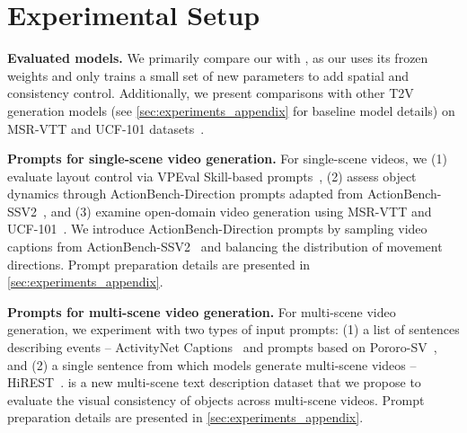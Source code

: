 \documentclass{article}
\begin{document}
\section{Experimental Setup}\label{sec:experiments}

\noindent\textbf{Evaluated models.} 
We primarily compare our \method{} with \modelscope{}, as our \videomodule{} uses its frozen weights and only trains a small set of new parameters to add spatial and consistency control. 
Additionally, we present comparisons with other T2V generation models (see \cref{sec:experiments_appendix} for baseline model details) on MSR-VTT and UCF-101 datasets~\citep{xu2016msr-vtt, soomro2012ucf101}.

\vspace{5pt}
\noindent\textbf{Prompts for single-scene video generation.}
For single-scene videos, 
we (1) evaluate layout control via VPEval Skill-based prompts~\citep{cho2023visual}, 
(2) assess object dynamics through ActionBench-Direction prompts adapted from ActionBench-SSV2~\citep{wang2023paxion}, 
and (3) examine open-domain video generation using MSR-VTT and UCF-101~\citep{xu2016msr-vtt, soomro2012ucf101}.
We introduce ActionBench-Direction prompts by sampling video captions from ActionBench-SSV2~\citep{wang2023paxion} and balancing the distribution of movement directions. 
Prompt preparation details are presented in \cref{sec:experiments_appendix}.



\vspace{5pt}
\noindent\textbf{Prompts for multi-scene video generation.} 
For multi-scene video generation,
we experiment with two types of input prompts:
(1) a list of sentences describing events -- ActivityNet Captions~\citep{krishna2017dense} and
\corefdata{} prompts based on Pororo-SV~\citep{li2018storygan}, and
(2) a single sentence from which models generate multi-scene videos -- HiREST~\citep{zala2023hierarchical}.
\corefdata{} is a new multi-scene text description dataset
that we propose to 
evaluate the visual consistency of objects across multi-scene videos.
Prompt preparation details are presented in \cref{sec:experiments_appendix}.
\end{document}
